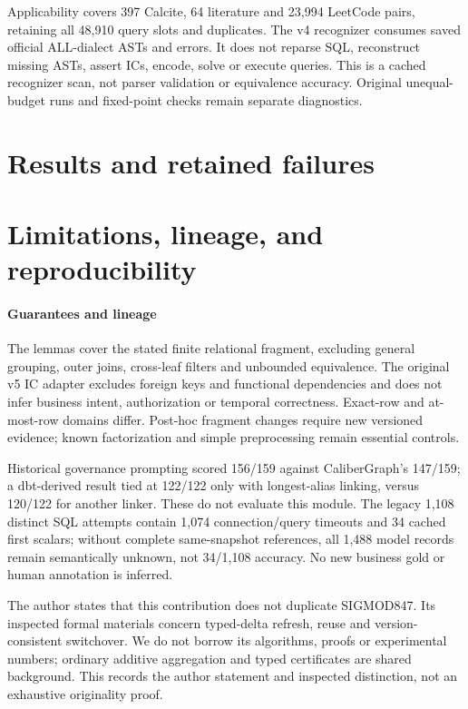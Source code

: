 \documentclass[3p,times,authoryear]{elsarticle}
\begin{document}
Applicability covers 397 Calcite, 64 literature and 23,994 LeetCode pairs, retaining all 48,910 query slots and duplicates. The v4 recognizer consumes saved official ALL-dialect ASTs and errors. It does not reparse SQL, reconstruct missing ASTs, assert ICs, encode, solve or execute queries. This is a cached recognizer scan, not parser validation or equivalence accuracy. Original unequal-budget runs and fixed-point checks remain separate diagnostics.

\section{Results and retained failures}\label{sec:results}




\section{Limitations, lineage, and reproducibility}
\paragraph{Guarantees and lineage}
The lemmas cover the stated finite relational fragment, excluding general grouping, outer joins, cross-leaf filters and unbounded equivalence. The original v5 IC adapter excludes foreign keys and functional dependencies and does not infer business intent, authorization or temporal correctness. Exact-row and at-most-row domains differ. Post-hoc fragment changes require new versioned evidence; known factorization and simple preprocessing remain essential controls.

Historical governance prompting scored 156/159 against CaliberGraph's 147/159; a dbt-derived result tied at 122/122 only with longest-alias linking, versus 120/122 for another linker. These do not evaluate this module. The legacy 1,108 distinct SQL attempts contain 1,074 connection/query timeouts and 34 cached first scalars; without complete same-snapshot references, all 1,488 model records remain semantically unknown, not 34/1,108 accuracy. No new business gold or human annotation is inferred.

The author states that this contribution does not duplicate SIGMOD847. Its inspected formal materials concern typed-delta refresh, reuse and version-consistent switchover. We do not borrow its algorithms, proofs or experimental numbers; ordinary additive aggregation and typed certificates are shared background. This records the author statement and inspected distinction, not an exhaustive originality proof.
\end{document}
